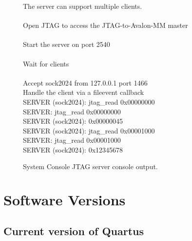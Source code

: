 \documentclass[10pt,twoside]{article}
\begin{document}
\begin{figure}
{\begin{minipage}{140mm}
The server can support multiple clients.\\
\\
Open JTAG to access the JTAG-to-Avalon-MM master\\
\\
Start the server on port 2540\\
\\
Wait for clients\\
\\
Accept sock2024 from 127.0.0.1 port 1466\\
Handle the client via a fileevent callback\\
SERVER (sock2024): jtag\_read 0x00000000\\
SERVER: jtag\_read 0x00000000\\
SERVER (sock2024): 0x00000045\\
SERVER (sock2024): jtag\_read 0x00001000\\
SERVER: jtag\_read 0x00001000\\
SERVER (sock2024): 0x12345678\\
\vspace{1mm}
\end{minipage}
}\hfil
\caption{System Console JTAG server console output.}
\label{fig:system_console_jtag_server}
\end{figure}

\clearpage
\appendix
\section{Software Versions}
\label{sec:software_versions}

\subsection*{Current version of Quartus}
\end{document}
